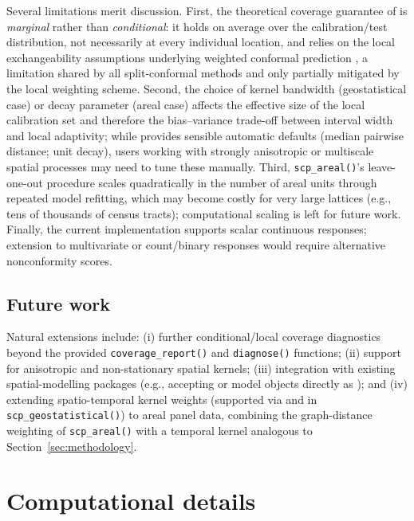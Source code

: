 \documentclass[article]{jss}
\begin{document}
Several limitations merit discussion. First, the theoretical coverage guarantee of  is \emph{marginal} rather than \emph{conditional}: it holds on average over the calibration/test distribution, not necessarily at every individual location, and relies on the local exchangeability assumptions underlying weighted conformal prediction \citep{Tibshirani+al:2019}, a limitation shared by all split-conformal methods and only partially mitigated by the local weighting scheme. Second, the choice of kernel bandwidth (geostatistical case) or decay parameter (areal case) affects the effective size of the local calibration set and therefore the bias--variance trade-off between interval width and local adaptivity; while  provides sensible automatic defaults (median pairwise distance; unit decay), users working with strongly anisotropic or multiscale spatial processes may need to tune these manually. Third, \texttt{scp\_areal()}'s leave-one-out procedure scales quadratically in the number of areal units through repeated model refitting, which may become costly for very large lattices (e.g., tens of thousands of census tracts); computational scaling is left for future work. Finally, the current implementation supports scalar continuous responses; extension to multivariate or count/binary responses would require alternative nonconformity scores.

\subsection{Future work}

Natural extensions include: (i) further conditional/local coverage diagnostics beyond the provided \texttt{coverage\_report()} and \texttt{diagnose()} functions; (ii) support for anisotropic and non-stationary spatial kernels; (iii) integration with existing spatial-modelling packages (e.g., accepting  or  model objects directly as ); and (iv) extending spatio-temporal kernel weights (supported via  and  in \texttt{scp\_geostatistical()}) to areal panel data, combining the graph-distance weighting of \texttt{scp\_areal()} with a temporal kernel analogous to Section~\ref{sec:methodology}.


\section*{Computational details}
\end{document}
